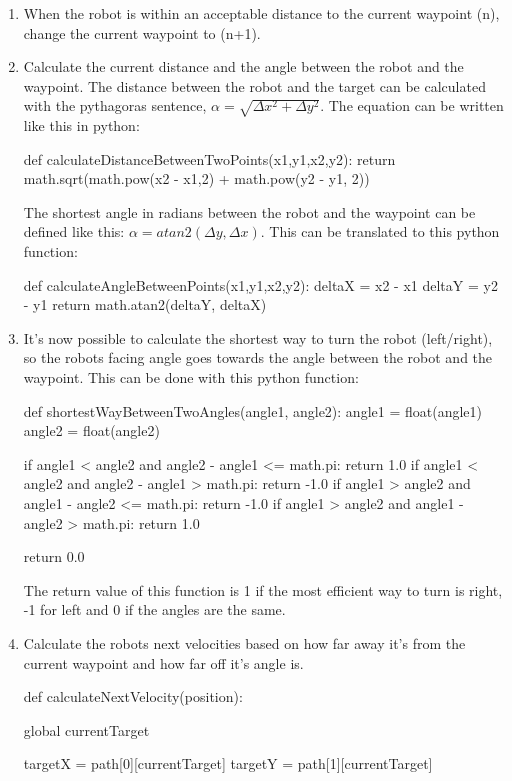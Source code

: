 \documentclass[10pt]{report}
\begin{document}
\begin{enumerate}
    \item When the robot is within an acceptable distance to the current waypoint (n), change the current waypoint to (n+1).
    \item Calculate the current distance and the angle between the robot and the waypoint. The distance between the robot and the target can be calculated with the pythagoras sentence, $\alpha = \sqrt{\Delta x^{2} + \Delta y^{2}}$.
    The equation can be written like this in python: 
    \begin{python}
def calculateDistanceBetweenTwoPoints(x1,y1,x2,y2):
    return math.sqrt(math.pow(x2 - x1,2) + math.pow(y2 - y1, 2))
    \end{python}
    The shortest angle in radians between the robot and the waypoint can be defined like this: $\alpha = atan2(\Delta y, \Delta x)$.
    This can be translated to this python function:
    \begin{python}
def calculateAngleBetweenPoints(x1,y1,x2,y2):
    deltaX = x2 - x1
    deltaY = y2 - y1
    return math.atan2(deltaY, deltaX)
    \end{python}    
    \item It's now possible to calculate the shortest way to turn the robot (left/right), so the robots facing angle goes towards the angle between the robot and the waypoint. This can be done with this python function: \begin{python}
def shortestWayBetweenTwoAngles(angle1, angle2): 
    angle1 = float(angle1)
    angle2 = float(angle2)

    if angle1 < angle2 and angle2 - angle1 <= math.pi:
        return 1.0
    if angle1 < angle2 and angle2 - angle1 > math.pi:
        return -1.0
    if angle1 > angle2 and angle1 - angle2 <= math.pi:
        return -1.0
    if angle1 > angle2 and angle1 - angle2 > math.pi:
        return 1.0

    return 0.0
    \end{python} The return value of this function is 1 if the most efficient way to turn is right, -1 for left and 0 if the angles are the same. 
    \item Calculate the robots next velocities based on how far away it's from the current waypoint and how far off it's angle is. 
    \begin{python}
def calculateNextVelocity(position):
    
    global currentTarget

    targetX = path[0][currentTarget]
    targetY = path[1][currentTarget]


\end{python}
\end{enumerate}
\end{document}
